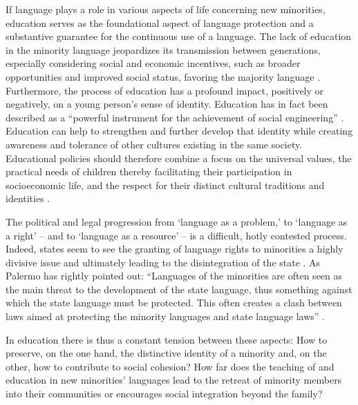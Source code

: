 \documentclass[output=paper,colorlinks,citecolor=brown]{langscibook}
\begin{document}
If language plays a role in various aspects of life concerning new minorities, education serves as the foundational aspect of language protection and a substantive guarantee for the continuous use of a language. The lack of education in the minority language jeopardizes its transmission between generations, especially considering social and economic incentives, such as broader opportunities and improved social status, favoring the majority language \citep{deschutter_robichaud2016}. Furthermore, the process of education has a profound impact, positively or negatively, on a young person's sense of identity. Education has in fact been described as a ``powerful instrument for the achievement of social engineering'' \citep{thornberry_estebanez2004}. Education can help to strengthen and further develop that identity while creating awareness and tolerance of other cultures existing in the same society. Educational policies should therefore combine a focus on the universal values, the practical needs of children thereby facilitating their participation in socioeconomic life, and the respect for their distinct cultural traditions and identities \citep{acfc2024}.

The political and legal progression from `language as a problem,' to `language as a right' – and to `language as a resource' \citep{ruiz1984,gogolin1994,ruiz2010,dejong_li_zafar_wu2016} – is a difficult, hotly contested process. Indeed, states seem to see the granting of language rights to minorities a highly divisive issue and ultimately leading to the disintegration of the state \citep{skutnabb-kangas2008,vertovec_wessendorf2005}. As Palermo has rightly pointed out: ``Languages of the minorities are often seen as the main threat to the development of the state language, thus something against which the state language must be protected. This often creates a clash between laws aimed at protecting the minority languages and state language laws'' \citep{palermo2012}.

In education there is thus a constant tension between these aspects: How to preserve, on the one hand, the distinctive identity of a minority and, on the other, how to contribute to social cohesion? How far does the teaching of and education in new minorities' languages lead to the retreat of minority members into their communities or encourages social integration beyond the family?
\end{document}
